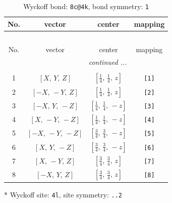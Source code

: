 \documentclass[fleqn,8pt]{jsarticle}
\begin{document}
\renewcommand{\arraystretch}{1.2}
\begin{longtable}{cccc}
\caption{Wyckoff bond: {\tt 8c@4k}, bond symmetry: {\tt 1}}
 \\
 \hline \hline
No. & vector & center & mapping \\ \hline \endfirsthead

\multicolumn{3}{l}{\tablename\ \thetable{}} \\
 \hline \hline
No. & vector & center & mapping \\ \hline \endhead

 \hline \hline
\multicolumn{3}{r}{\footnotesize\it continued ...} \\ \endfoot

 \hline \hline
\multicolumn{3}{r}{} \\ \endlastfoot

1 & $\left[ X,\, Y,\, Z \right]$ & $\left[ \frac{1}{4},\, \frac{1}{4},\, z \right]$ & {\tt [1]} \\ \hline
2 & $\left[ - X,\, - Y,\, Z \right]$ & $\left[ \frac{1}{4},\, \frac{1}{4},\, z \right]$ & {\tt [2]} \\ \hline
3 & $\left[ - X,\, Y,\, - Z \right]$ & $\left[ \frac{1}{4},\, \frac{1}{4},\, - z \right]$ & {\tt [3]} \\ \hline
4 & $\left[ X,\, - Y,\, - Z \right]$ & $\left[ \frac{1}{4},\, \frac{1}{4},\, - z \right]$ & {\tt [4]} \\ \hline
5 & $\left[ - X,\, - Y,\, - Z \right]$ & $\left[ \frac{3}{4},\, \frac{3}{4},\, - z \right]$ & {\tt [5]} \\ \hline
6 & $\left[ X,\, Y,\, - Z \right]$ & $\left[ \frac{3}{4},\, \frac{3}{4},\, - z \right]$ & {\tt [6]} \\ \hline
7 & $\left[ X,\, - Y,\, Z \right]$ & $\left[ \frac{3}{4},\, \frac{3}{4},\, z \right]$ & {\tt [7]} \\ \hline
8 & $\left[ - X,\, Y,\, Z \right]$ & $\left[ \frac{3}{4},\, \frac{3}{4},\, z \right]$ & {\tt [8]} \\
\end{longtable}
* Wyckoff site: {\tt 4l}, site symmetry: {\tt ..2}
\renewcommand{\arraystretch}{1.2}
\end{document}
